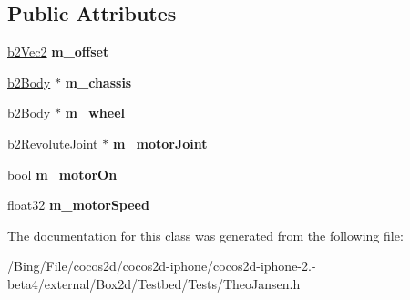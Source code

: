 \subsection*{Public Attributes}
\begin{DoxyCompactItemize}
\item 
\hypertarget{class_theo_jansen_ab869117515313c672813c3d8106f5f9e}{\hyperlink{structb2_vec2}{b2\-Vec2} {\bfseries m\-\_\-offset}}\label{class_theo_jansen_ab869117515313c672813c3d8106f5f9e}

\item 
\hypertarget{class_theo_jansen_aff91e6052ad212367d07610b50ed0a52}{\hyperlink{classb2_body}{b2\-Body} $\ast$ {\bfseries m\-\_\-chassis}}\label{class_theo_jansen_aff91e6052ad212367d07610b50ed0a52}

\item 
\hypertarget{class_theo_jansen_ab8d25a89f5da7aa767e7aa38e060580e}{\hyperlink{classb2_body}{b2\-Body} $\ast$ {\bfseries m\-\_\-wheel}}\label{class_theo_jansen_ab8d25a89f5da7aa767e7aa38e060580e}

\item 
\hypertarget{class_theo_jansen_a73b6a712c61fa6aa9b69fccee9b8db7e}{\hyperlink{classb2_revolute_joint}{b2\-Revolute\-Joint} $\ast$ {\bfseries m\-\_\-motor\-Joint}}\label{class_theo_jansen_a73b6a712c61fa6aa9b69fccee9b8db7e}

\item 
\hypertarget{class_theo_jansen_ae202fb621aa29c934a4fab6427f83455}{bool {\bfseries m\-\_\-motor\-On}}\label{class_theo_jansen_ae202fb621aa29c934a4fab6427f83455}

\item 
\hypertarget{class_theo_jansen_ad56a2c19dd486e13c3604223bdc2899e}{float32 {\bfseries m\-\_\-motor\-Speed}}\label{class_theo_jansen_ad56a2c19dd486e13c3604223bdc2899e}

\end{DoxyCompactItemize}


The documentation for this class was generated from the following file\-:\begin{DoxyCompactItemize}
\item 
/\-Bing/\-File/cocos2d/cocos2d-\/iphone/cocos2d-\/iphone-\/2.-\/beta4/external/\-Box2d/\-Testbed/\-Tests/Theo\-Jansen.\-h\end{DoxyCompactItemize}
